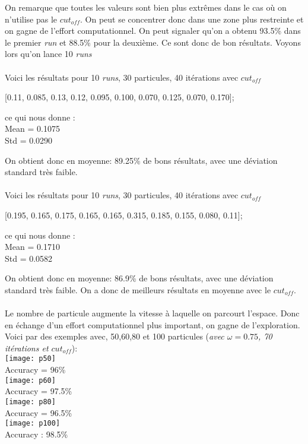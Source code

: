 \documentclass[a4paper, 11pt]{article}
\begin{document}
On remarque que toutes les valeurs sont bien plus extrêmes dans le cas où on n'utilise pas le $cut_{off}$. On peut se concentrer donc 
dans une zone plus restreinte et on gagne de l'effort computationnel. On peut signaler qu'on a obtenu 93.5\% dans le premier \textit{run}
et 88.5\% pour la deuxième. Ce sont donc de bon résultats. Voyons lors qu'on lance 10 \textit{runs}

\paragraph{}
Voici les résultats pour 10 \textit{runs}, 30 particules, 40 itérations avec $cut_{off}$
\begin{center}

[0.11, 0.085, 0.13, 0.12, 0.095, 0.100, 0.070, 0.125, 0.070, 0.170]; 
\end{center}

ce qui nous donne :\\
Mean = 	0.1075\\
Std  = 	0.0290

On obtient donc en moyenne: 89.25\% de bons résultats, avec une déviation standard très faible.

\paragraph{}
Voici les résultats pour 10 \textit{runs}, 30 particules, 40 itérations avec $cut_{off}$
\begin{center}

[0.195, 0.165, 0.175, 0.165, 0.165, 0.315, 0.185, 0.155, 0.080, 0.11];
\end{center}

ce qui nous donne :\\
Mean = 	0.1710\\
Std  = 	0.0582

On obtient donc en moyenne: 86.9\% de bons résultats, avec une déviation standard très faible.
On a donc de meilleurs résultats en moyenne avec le $cut_{off}$.

\paragraph{}
Le nombre de particule augmente la vitesse à laquelle on parcourt l'espace. Donc en échange d'un effort computationnel plus important, on
gagne de l'exploration. Voici par des exemples avec, 50,60,80 et 100 particules (\textit{avec $\omega = 0.75$, 70 itérations et $cut_{off}$}):
\\
\texttt{[image: p50]}\\
Accuracy = 96\%
\\
\texttt{[image: p60]}\\
Accuracy = 97.5\%
\\
\texttt{[image: p80]}\\
Accuracy = 96.5\%
\\
\texttt{[image: p100]}\\
Accuracy : 98.5\%
\end{document}
